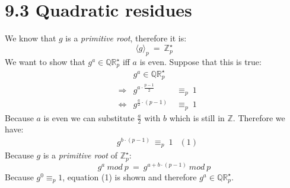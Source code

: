 \documentclass{report}
\begin{document}
	\section*{9.3 Quadratic residues}
		We know that $g$ is a \textit{primitive root}, therefore it is:
		\[
			\langle g \rangle _p \ = \ \mathbb{Z}_p^{\star}
		\]
		We want to show that $g^a \in \mathbb{Q}\mathbb{R}_p^{\star}$ iff $a$ is even. Suppose that this is true:
		\begin{align*}
			& & g^a \in \mathbb{Q}\mathbb{R}_p^{\star} \\
			& \Rightarrow & g^{a \cdot \frac{p-1}{2}} \ & \equiv _p \ 1 \\
			& \Leftrightarrow & g^{\frac{a}{2} \cdot (p-1)} \ & \equiv_p \ 1
		\end{align*}
		Because $a$ is even we can substitute $\frac{a}{2}$ with $b$ which is still in $\mathbb{Z}$. Therefore we have:
		\begin{align*}
			& g^{b \cdot (p-1)} \ \equiv_p \ 1 & (1)
		\end{align*}
		Because $g$ is a \textit{primitive root} of $\mathbb{Z}_p^{\star}$:
		\[
			g^a \ mod \ p \ = \ g^{a + b \cdot (p-1)} \ mod \ p
		\]
		Because $g^0 \equiv_p 1$, equation (1) is shown and therefore $g^a \in \mathbb{Q}\mathbb{R}_p^{\star}$.
	
\end{document}
